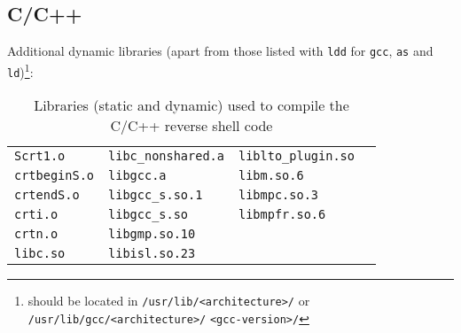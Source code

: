 \newpage

\subsection*{C/C++}


Additional dynamic libraries (apart from those listed with \texttt{ldd} for \texttt{gcc}, \texttt{as} and \texttt{ld})\footnote{should be located in \texttt{/usr/lib/<architecture>/} or \texttt{/usr/lib/gcc/<architecture>/} \texttt{<gcc-version>/}}:

\begin{longtable}{l l l l}
\caption{Libraries (static and dynamic) used to compile the C/C++ reverse shell code}\label{tab:c-dpd-lib} \\
\texttt{Scrt1.o} & \texttt{libc\_nonshared.a} & \texttt{liblto\_plugin.so} \\
\texttt{crtbeginS.o} & \texttt{libgcc.a} & \texttt{libm.so.6} \\
\texttt{crtendS.o} & \texttt{libgcc\_s.so.1} & \texttt{libmpc.so.3} \\
\texttt{crti.o} & \texttt{libgcc\_s.so} & \texttt{libmpfr.so.6} \\
\texttt{crtn.o} & \texttt{libgmp.so.10} &  \\
\texttt{libc.so} & \texttt{libisl.so.23} &  \\
\end{longtable}



